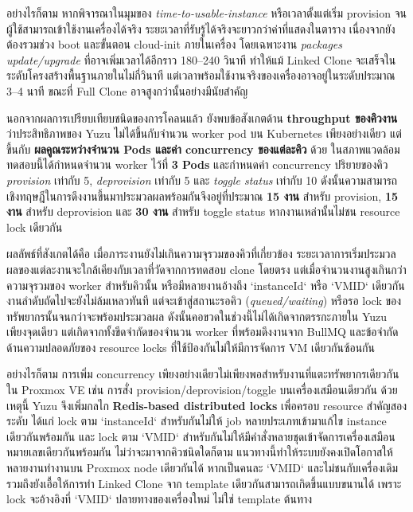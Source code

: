 \hspace*{1.3em}
อย่างไรก็ตาม หากพิจารณาในมุมของ \textit{time-to-usable-instance} หรือเวลาตั้งแต่เริ่ม provision จนผู้ใช้สามารถเข้าใช้งานเครื่องได้จริง ระยะเวลาที่รับรู้ได้จริงจะยาวกว่าค่าที่แสดงในตาราง เนื่องจากยังต้องรวมช่วง boot และขั้นตอน cloud-init ภายในเครื่อง โดยเฉพาะงาน \textit{packages update/upgrade} ที่อาจเพิ่มเวลาได้อีกราว 180--240 วินาที ทำให้แม้ Linked Clone จะเสร็จในระดับโครงสร้างพื้นฐานภายในไม่กี่วินาที แต่เวลาพร้อมใช้งานจริงของเครื่องอาจอยู่ในระดับประมาณ 3--4 นาที ขณะที่ Full Clone อาจสูงกว่านั้นอย่างมีนัยสำคัญ

\hspace*{1.3em}
นอกจากผลการเปรียบเทียบชนิดของการโคลนแล้ว ยังพบข้อสังเกตด้าน \textbf{throughput ของคิวงาน} ว่าประสิทธิภาพของ Yuzu ไม่ได้ขึ้นกับจำนวน worker pod บน Kubernetes เพียงอย่างเดียว แต่ขึ้นกับ \textbf{ผลคูณระหว่างจำนวน Pods และค่า concurrency ของแต่ละคิว} ด้วย ในสภาพแวดล้อมทดสอบนี้ได้กำหนดจำนวน worker ไว้ที่ \textbf{3 Pods} และกำหนดค่า concurrency ปริยายของคิว \textit{provision} เท่ากับ 5, \textit{deprovision} เท่ากับ 5 และ \textit{toggle status} เท่ากับ 10 ดังนั้นความสามารถเชิงทฤษฎีในการดึงงานขึ้นมาประมวลผลพร้อมกันจึงอยู่ที่ประมาณ \textbf{15 งาน} สำหรับ provision, \textbf{15 งาน} สำหรับ deprovision และ \textbf{30 งาน} สำหรับ toggle status หากงานเหล่านั้นไม่ชน resource lock เดียวกัน

\hspace*{1.3em}
ผลลัพธ์ที่สังเกตได้คือ เมื่อภาระงานยังไม่เกินความจุรวมของคิวที่เกี่ยวข้อง ระยะเวลาการเริ่มประมวลผลของแต่ละงานจะใกล้เคียงกับเวลาที่วัดจากการทดสอบ clone โดยตรง แต่เมื่อจำนวนงานสูงเกินกว่าความจุรวมของ worker สำหรับคิวนั้น หรือมีหลายงานอ้างถึง `instanceId` หรือ `VMID` เดียวกัน งานลำดับถัดไปจะยังไม่ล้มเหลวทันที แต่จะเข้าสู่สถานะรอคิว (\textit{queued/waiting}) หรือรอ lock ของทรัพยากรนั้นจนกว่าจะพร้อมประมวลผล ดังนั้นคอขวดในช่วงนี้ไม่ได้เกิดจากตรรกะภายใน Yuzu เพียงจุดเดียว แต่เกิดจากทั้งขีดจำกัดของจำนวน worker ที่พร้อมดึงงานจาก BullMQ และข้อจำกัดด้านความปลอดภัยของ resource locks ที่ใช้ป้องกันไม่ให้มีการจัดการ VM เดียวกันซ้อนกัน

\hspace*{1.3em}
อย่างไรก็ตาม การเพิ่ม concurrency เพียงอย่างเดียวไม่เพียงพอสำหรับงานที่แตะทรัพยากรเดียวกันใน Proxmox VE เช่น การสั่ง provision/deprovision/toggle บนเครื่องเสมือนเดียวกัน ด้วยเหตุนี้ Yuzu จึงเพิ่มกลไก \textbf{Redis-based distributed locks} เพื่อครอบ resource สำคัญสองระดับ ได้แก่ lock ตาม `instanceId` สำหรับกันไม่ให้ job หลายประเภทเข้ามาแก้ไข instance เดียวกันพร้อมกัน และ lock ตาม `VMID` สำหรับกันไม่ให้มีคำสั่งหลายชุดเข้าจัดการเครื่องเสมือนหมายเลขเดียวกันพร้อมกัน ไม่ว่าจะมาจากคิวชนิดใดก็ตาม แนวทางนี้ทำให้ระบบยังคงเปิดโอกาสให้หลายงานทำงานบน Proxmox node เดียวกันได้ หากเป็นคนละ `VMID` และไม่ชนกับเครื่องเดิม รวมถึงยังเอื้อให้การทำ Linked Clone จาก template เดียวกันสามารถเกิดขึ้นแบบขนานได้ เพราะ lock จะอ้างอิงที่ `VMID` ปลายทางของเครื่องใหม่ ไม่ใช่ template ต้นทาง

